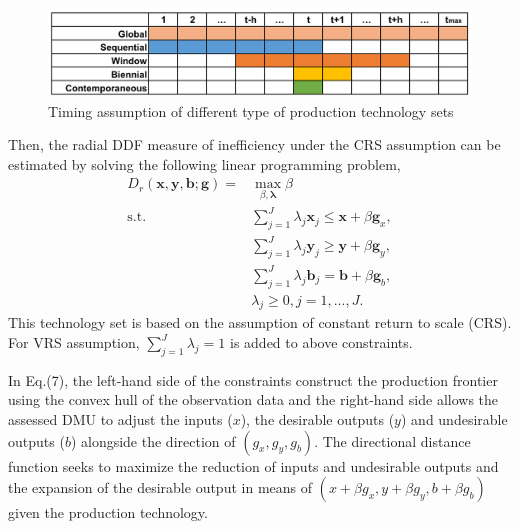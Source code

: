 \begin{figure}[ht]
    \centering
    \includegraphics[scale=0.65]{SJF2.pdf}
    \caption{Timing assumption of different type of production technology sets} 
    \label{fig_time}
\end{figure}


Then, the radial DDF measure of inefficiency under the CRS assumption can be estimated by solving the following linear programming problem,
\begin{equation}\begin{split}\label{eq_eff_r}
    D_r (\pmb{x},\pmb{y},\pmb{b};\pmb{g}) 
    = &\max _{\beta,\pmb{\lambda}} \beta  \\ 
    \text{s.t.} &\sum\limits_{j = 1}^J {\lambda _j \pmb{x}_j \le \pmb{x} + \beta \pmb{g}_x}, \\ 
                &\sum\limits_{j = 1}^J {\lambda _j \pmb{y}_j \ge \pmb{y} + \beta \pmb{g}_y}, \\ 
                &\sum\limits_{j = 1}^J {\lambda _j \pmb{b}_j = \pmb{b} + \beta \pmb{g}_b}, \\ 
                &\lambda _j \ge 0, j = 1,...,J.
\end{split}\end{equation}
This technology set is based on the assumption of constant return to scale (CRS). For VRS assumption, $\sum_{j=1}^{J} \lambda_j =1$ is added to above constraints.

In Eq.(7), the left-hand side of the constraints construct the production frontier using the convex hull of the observation data and the right-hand side allows the assessed DMU to adjust the inputs ($x$), the desirable outputs ($y$) and undesirable outputs ($b$) alongside the direction of $(g_x,g_y,g_b)$. The directional distance function seeks to maximize the reduction of inputs and undesirable outputs and the expansion of the desirable output in means of $(x+\beta g_x, y+ \beta g_y, b+\beta g_b)$ given the production technology. 

